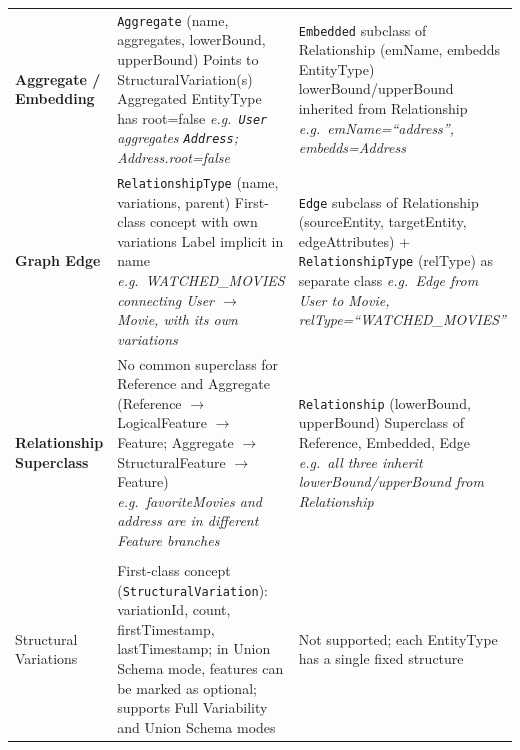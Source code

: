 \begin{longtable}{@{} >{\raggedright\arraybackslash\bfseries}p{} >{\raggedright\arraybackslash}p{}
  >{\raggedright\arraybackslash}p{} @{}}
  Aggregate / Embedding &
  \texttt{Aggregate} (name, aggregates, lowerBound, upperBound) \newline Points to StructuralVariation(s) \newline Aggregated EntityType has
  root=false \newline
  \textit{e.g.\ \texttt{User} aggregates \texttt{Address}; Address.root=false} &
  \texttt{Embedded} subclass of Relationship (emName, embedds EntityType) \newline lowerBound/upperBound inherited from Relationship \newline
  \textit{e.g.\ emName=``address'', embedds=Address} \\

  Graph Edge &
  \texttt{RelationshipType} (name, variations, parent) \newline First-class concept with own variations \newline Label implicit in name \newline
  \textit{e.g.\ WATCHED\_MOVIES connecting User $\to$ Movie, with its own variations} &
  \texttt{Edge} subclass of Relationship (sourceEntity, targetEntity, edgeAttributes) + \texttt{RelationshipType} (relType) as separate class
  \newline
  \textit{e.g.\ Edge from User to Movie, relType=``WATCHED\_MOVIES''} \\

  Relationship Superclass &
  No common superclass for Reference and Aggregate \newline (Reference $\to$ LogicalFeature $\to$ Feature; \newline Aggregate $\to$
  StructuralFeature $\to$ Feature) \newline
  \textit{e.g.\ favoriteMovies and address are in different Feature branches} &
  \texttt{Relationship} (lowerBound, upperBound) \newline Superclass of Reference, Embedded, Edge \newline
  \textit{e.g.\ all three inherit lowerBound/upperBound from Relationship} \\

  \midrule
  \multicolumn{3}{l}{\cellcolor{gray!15}\textit{Key Differences}} \\
  \midrule

  Structural Variations &
  First-class concept (\texttt{StructuralVariation}): variationId, count, firstTimestamp, lastTimestamp; in Union Schema mode, features can be
  marked as optional; supports Full Variability and Union Schema modes &
  Not supported; each EntityType has a single fixed structure \\


\end{longtable}
